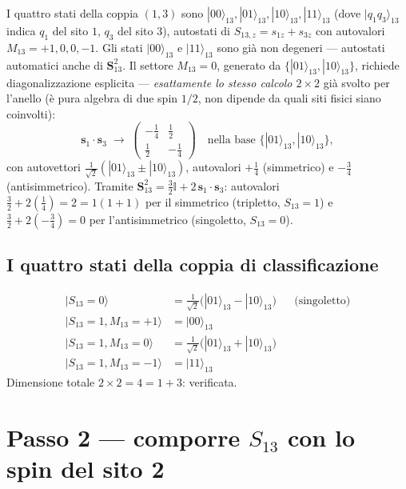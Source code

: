 \documentclass[11pt,a4paper]{article}
\begin{document}
I quattro stati della coppia $(1,3)$ sono $|00\rangle_{13},|01\rangle_{13},|10\rangle_{13},|11\rangle_{13}$
(dove $|q_1q_3\rangle_{13}$ indica $q_1$ del sito $1$, $q_3$ del sito $3$),
autostati di $S_{13,z}=s_{1z}+s_{3z}$ con autovalori $M_{13}=+1,0,0,-1$. Gli
stati $|00\rangle_{13}$ e $|11\rangle_{13}$ sono già non degeneri — autostati
automatici anche di $\mathbf S_{13}^2$. Il settore $M_{13}=0$, generato da
$\{|01\rangle_{13},|10\rangle_{13}\}$, richiede diagonalizzazione esplicita —
\emph{esattamente lo stesso calcolo $2\times2$} già svolto per l'anello (è
pura algebra di due spin $1/2$, non dipende da quali siti fisici siano
coinvolti):
\begin{equation}
\mathbf s_1\cdot\mathbf s_3\;\longrightarrow\;
\begin{pmatrix}-\tfrac14 & \tfrac12\\ \tfrac12 & -\tfrac14\end{pmatrix}
\quad\text{nella base }\{|01\rangle_{13},|10\rangle_{13}\},
\end{equation}
con autovettori $\tfrac1{\sqrt2}(|01\rangle_{13}\pm|10\rangle_{13})$, autovalori
$+\tfrac14$ (simmetrico) e $-\tfrac34$ (antisimmetrico). Tramite
$\mathbf S_{13}^2=\tfrac32\mathbb I+2\,\mathbf s_1\cdot\mathbf s_3$: autovalori
$\tfrac32+2(\tfrac14)=2=1(1{+}1)$ per il simmetrico (tripletto, $S_{13}=1$)
e $\tfrac32+2(-\tfrac34)=0$ per l'antisimmetrico (singoletto, $S_{13}=0$).

\subsection{I quattro stati della coppia di classificazione}

\begin{align}
|S_{13}{=}0\rangle &= \tfrac1{\sqrt2}\big(|01\rangle_{13}-|10\rangle_{13}\big) &&\text{(singoletto)}\label{eq:s13_0}\\
|S_{13}{=}1,M_{13}{=}{+}1\rangle &= |00\rangle_{13} \\
|S_{13}{=}1,M_{13}{=}0\rangle &= \tfrac1{\sqrt2}\big(|01\rangle_{13}+|10\rangle_{13}\big) \\
|S_{13}{=}1,M_{13}{=}{-}1\rangle &= |11\rangle_{13}
\end{align}
Dimensione totale $2\times2=4=1+3$: verificata.

\section{Passo 2 — comporre $S_{13}$ con lo spin del sito 2}
\end{document}
